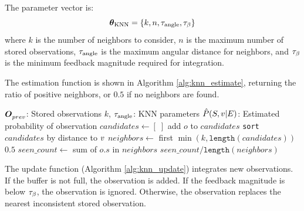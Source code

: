 The parameter vector is:
$$
    \boldsymbol{\theta}_{\text{KNN}} = \{k, n, \tau_{\text{angle}}, \tau_{\beta}\}
$$
where $k$ is the number of neighbors to consider, $n$ is the maximum number of stored observations, $\tau_{\text{angle}}$ is the maximum angular distance for neighbors, and $\tau_{\beta}$ is the minimum feedback magnitude required for integration.

The estimation function is shown in Algorithm \ref{alg:knn_estimate}, returning the ratio of positive neighbors, or $0.5$ if no neighbors are found.

\begin{singlespace}
    \begin{algorithm}[H]
        \caption[KNN Observability Estimation]{KNN $\estimate{\viewpoint}$}
        \label{alg:knn_estimate}
        \begin{algorithmic}
            \Require $\boldsymbol{O}^{}_{prev}$: Stored observations
            \Require $k$, $\tau_{\text{angle}}$: KNN parameters
            \Ensure $\hat{P}(S,v|E)$: Estimated probability of observation
            \Function{$\estimate$}{$\viewpoint$}
            \State $candidates \gets [\;]$
            \State add $o$ to $candidates$
            \EndIf
            \EndFor
            \State \texttt{sort} $candidates$ by distance to $\viewpoint$
            \State $neighbors \gets$ first $\min(k, \texttt{length}(candidates))$
            \State \Return $0.5$
            \EndIf
            \State $seen\_count \gets$ sum of $o.s$ in $neighbors$
            \State \Return $seen\_count / \texttt{length}(neighbors)$
            \EndFunction
        \end{algorithmic}
    \end{algorithm}
\end{singlespace}

The update function (Algorithm \ref{alg:knn_update}) integrates new observations. If the buffer is not full, the observation is added. If the feedback magnitude is below $\tau_{\beta}$, the observation is ignored. Otherwise, the observation replaces the nearest inconsistent stored observation.

